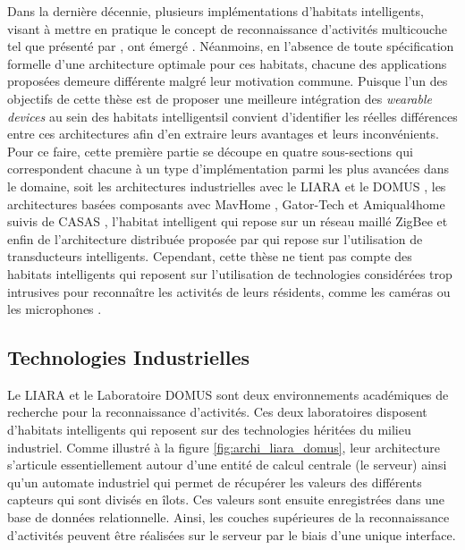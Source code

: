 Dans la dernière décennie, plusieurs implémentations d'habitats intelligents, visant à mettre en pratique le concept de reconnaissance d'activités multicouche tel que présenté par \cite{Roy2013}, ont émergé \citep{DJCook2003, Helal2005, Giroux2009, Cook2013, Bouchard2014, Lago2017}. Néanmoins, en l'absence de toute spécification formelle d'une architecture optimale pour ces habitats, chacune des applications proposées demeure différente malgré leur motivation commune. Puisque l'un des objectifs de cette thèse est de proposer une meilleure intégration des \textit{wearable devices} au sein des habitats intelligents\textemdash il convient d'identifier les réelles différences entre ces architectures afin d'en extraire leurs avantages et leurs inconvénients. Pour ce faire, cette première partie se découpe en quatre sous-sections qui correspondent chacune à un type d'implémentation parmi les plus avancées dans le domaine, soit les architectures industrielles avec le \acs{LIARA} \citep{Bouchard2014} et le \acs{DOMUS} \citep{Giroux2009}, les architectures basées composants avec MavHome \citep{DJCook2003}, Gator-Tech \citep{Helal2005} et Amiqual4home \citep{Lago2017} suivis de CASAS \citep{Cook2013}, l'habitat intelligent qui repose sur un réseau maillé ZigBee et enfin de l'architecture distribuée proposée par \cite{Plantevin2018} qui repose sur l'utilisation de transducteurs intelligents. Cependant, cette thèse ne tient pas compte des habitats intelligents qui reposent sur l'utilisation de technologies considérées trop intrusives pour reconnaître les activités de leurs résidents, comme les caméras ou les microphones \citep{Brumitt2000, Vacher2011}.

\subsection{Technologies Industrielles}

Le \acs{LIARA} \citep{Bouchard2014} et le Laboratoire \acs{DOMUS} \citep{Giroux2009} sont deux environnements académiques de recherche pour la reconnaissance d'activités. Ces deux laboratoires disposent d'habitats intelligents qui reposent sur des technologies héritées du milieu industriel. Comme illustré à la figure \ref{fig:archi_liara_domus}, leur architecture s'articule essentiellement autour d'une entité de calcul centrale (le serveur) ainsi qu'un automate industriel qui permet de récupérer les valeurs des différents capteurs qui sont divisés en îlots. Ces valeurs sont ensuite enregistrées dans une base de données relationnelle. Ainsi, les couches supérieures de la reconnaissance d'activités peuvent être réalisées sur le serveur par le biais d'une unique interface.

